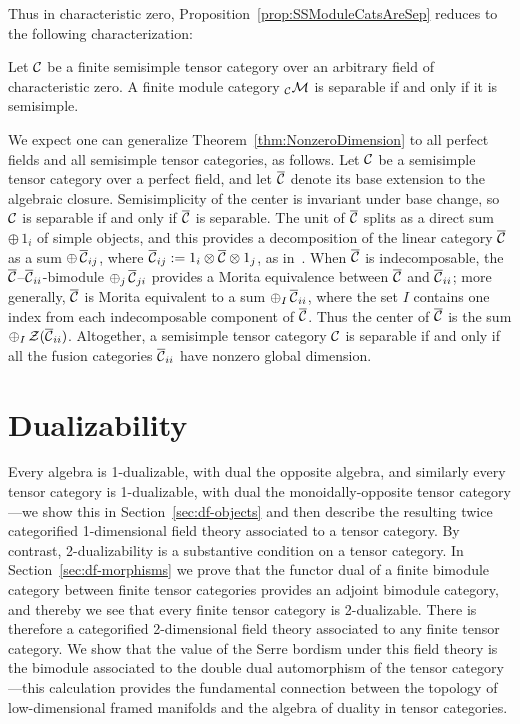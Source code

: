 \documentclass{amsart}
\begin{document}
\nid Thus in characteristic zero, Proposition~\ref{prop:SSModuleCatsAreSep} reduces to the following characterization:
\begin{corollary} \label{cor:charzeromodulesep}
Let $\mathcal C$ be a finite semisimple tensor category over an arbitrary field of characteristic zero.  A finite module category ${}_\mathcal C \mathcal M$ is separable if and only if it is semisimple.
\end{corollary}


\begin{remark} \label{rem:nonsimp}
We expect one can generalize Theorem~\ref{thm:NonzeroDimension} to all perfect fields and all semisimple tensor categories, as follows.  Let $\mathcal C$ be a semisimple tensor category over a perfect field, and let $\overline{\mathcal C}$ denote its base extension to the algebraic closure.  Semisimplicity of the center is invariant under base change, so $\mathcal C$ is separable if and only if $\overline{\mathcal C}$ is separable.  The unit of $\overline{\mathcal C}$ splits as a direct sum $\oplus \, 1_i$ of simple objects, and this provides a decomposition of the linear category $\overline{\mathcal C}$ as a sum $\oplus \,\overline{\mathcal C}_{ij}$, where $\overline{\mathcal C}_{ij} := 1_i \otimes\overline{\mathcal C}\otimes 1_j$, as in~\cite[\S 2.4]{MR2183279}.  When $\overline{\mathcal C}$ is indecomposable, the $\overline{\mathcal C}$--$\overline{\mathcal C}_{ii}$-bimodule $\oplus_j \,\overline{\mathcal C}_{ji}$ provides a Morita equivalence between $\overline{\mathcal C}$ and $\overline{\mathcal C}_{ii}$; more generally, $\overline{\mathcal C}$ is Morita equivalent to a sum $\oplus_I \,\overline{\mathcal C}_{ii}$, where the set $I$ contains one index from each indecomposable component of $\overline{\mathcal C}$.  Thus the center of $\overline{\mathcal C}$ is the sum $\oplus_I \,\mathcal Z(\overline{\mathcal C}_{ii})$.  Altogether, a semisimple tensor category $\mathcal C$ is separable if and only if all the fusion categories $\overline{\mathcal C}_{ii}$ have nonzero global dimension.
\end{remark}

\section{Dualizability} \label{sec:dualizability}


Every algebra is 1-dualizable, with dual the opposite algebra, and similarly every tensor category is 1-dualizable, with dual the monoidally-opposite tensor category---we show this in Section~\ref{sec:df-objects} and then describe the resulting twice categorified 1-dimensional field theory associated to a tensor category.  By contrast, 2-dualizability is a substantive condition on a tensor category.  In Section~\ref{sec:df-morphisms} we prove that the functor dual of a finite bimodule category between finite tensor categories provides an adjoint bimodule category, and thereby we see that every finite tensor category is 2-dualizable.  There is therefore a categorified 2-dimensional field theory associated to any finite tensor category.  We show that the value of the Serre bordism under this field theory is the bimodule associated to the double dual automorphism of the tensor category---this calculation provides the fundamental connection between the topology of low-dimensional framed manifolds and the algebra of duality in tensor categories.  
\end{document}
